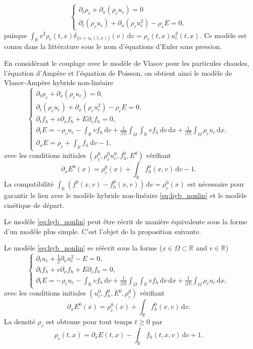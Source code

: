 $$
  \begin{cases}
    \partial_t \rho_c + \partial_x (\rho_cu_c) = 0 \\
    \partial_t (\rho_cu_c) + \partial_x (\rho_cu_c^2) - \rho_cE = 0,
  \end{cases}
$$
puisque $\int_{\mathbb{R}} v^2 \rho_c(t,x)\delta_{\{v=u_c(t,x)\}}(v) \,\mathrm{d}v = \rho_c(t,x) u_c^2 (t,x)$. Ce modèle est connu dans la littérature sous le nom d'équations d'Euler sans pression.

En considérant le couplage avec le modèle de Vlasov pour les particules chaudes, l'équation d'Ampère et l'équation de Poisson, on obtient ainsi le modèle de Vlasov-Ampère hybride non-linéaire
\begin{equation}
  \begin{cases}
    \partial_t \rho_c + \partial_x (\rho_cu_c) = 0, \\
    \partial_t (\rho_cu_c) + \partial_x (\rho_cu_c^2) - \rho_cE = 0, \\
    \partial_t f_h + v\partial_x f_h + E\partial_v f_h = 0, \\
    \partial_t E = -\rho_cu_c -\int_{\mathbb{R}} vf_h\,\mathrm{d}v+ \frac{1}{|\Omega|}\int_\Omega \int_{\mathbb{R}} vf_h\,\mathrm{d}v \,\mathrm{d}x+ \frac{1}{|\Omega|}\int_\Omega \rho_cu_c \,\mathrm{d}x, \\
    \partial_x E = \rho_c + \int_{\mathbb{R}} f_h\,\mathrm{d}v - 1, 
  \end{cases}
\label{eq:hyb_nonlin}
\end{equation}
avec les conditions initiales $(\rho^0_{c}, \rho^0_{c} u^0_{c}, f^0_{h}, E^0)$ vérifiant
$$
  \partial_x E^0(x) = \rho^0_{c}(x)+\int_{\mathbb{R}} f^0_{h}(x, v)\,\mathrm{d}v-1.
$$ 
La compatibilité $\int_{\mathbb{R}} (f^0(x, v) - f^0_h(x, v))\,\mathrm{d}v  = \rho^0_{c}(x)$ est nécessaire pour garantir le lien avec le modèle hybride non-linéaire \eqref{eq:hyb_nonlin} et le modèle cinétique de départ. 

Le modèle \eqref{eq:hyb_nonlin} peut être récrit de manière équivalente sous la forme d'un modèle plus simple. C'est l'objet de la proposition suivante.  
\begin{pro}
  Le modèle \eqref{eq:hyb_nonlin} se réécrit sous la forme ($x\in\Omega\subset \mathbb{R}$ and $v\in\mathbb{R}$)
  $$
    \begin{cases}
      \partial_t u_c + \frac{1}{2}\partial_x u_c^2 - E = 0, \\
      \partial_t f_h + v\partial_x f_h + E\partial_v f_h = 0, \\
      \partial_t E = -\rho_c u_c -\int_{\mathbb{R}} vf_h\,\mathrm{d}v+ \frac{1}{|\Omega|}\int_\Omega \int_{\mathbb{R}} vf_h\,\mathrm{d}v \,\mathrm{d}x+ \frac{1}{|\Omega|}\int_\Omega \rho_cu_c \,\mathrm{d}x,
      \label{eq:hyb_nonlin_red}
    \end{cases}
  $$
  avec les conditions initiales $(u^0_{c}, f^0_{h}, E^0, \rho_c^0)$ vérifiant
  $$
    \partial_x E^0(x) = \rho^0_{c}(x)+\int_{\mathbb{R}} f^0_{h}(x, v)\,\mathrm{d}v.
  $$
  La densité $\rho_c$ est obtenue pour tout temps $t\geq 0$ par  
  $$
    \rho_c(t, x) = \partial_x E(t, x) - \int_{\mathbb{R}} f_{h}(t, x, v)\,\mathrm{d}v + 1. 
  $$
\end{pro}

